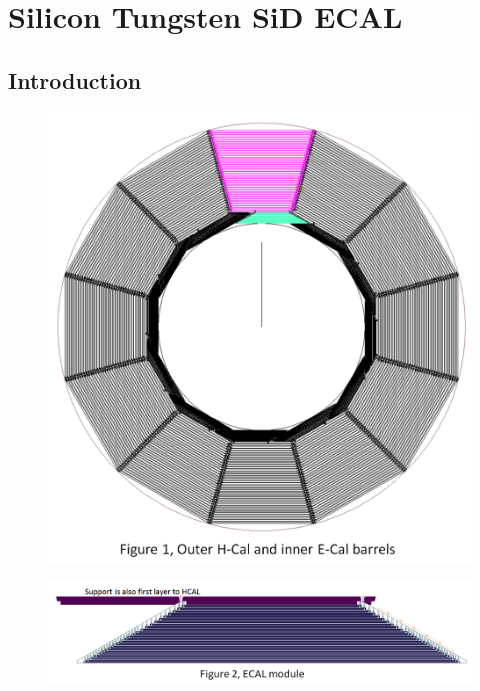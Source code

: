 \section{Silicon Tungsten SiD ECAL}
\subsection{Introduction}
\begin{figure}
\includegraphics[width=.5\linewidth]{Calorimeter/SiliconTungstenSiD/cross_section}
\end{figure}
\begin{figure}
\includegraphics[width=.5\linewidth]{Calorimeter/SiliconTungstenSiD/ecalModule}
\end{figure}

